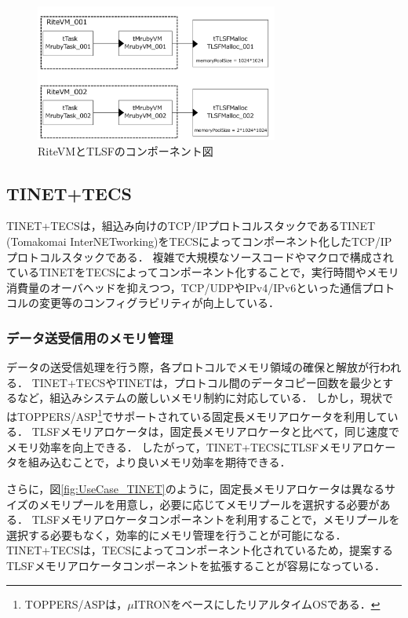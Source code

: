 \documentclass[submit,techrep]{ipsj_v2/UTF8/ipsj}
\begin{document}
\begin{figure}[t]
    \centering
    \includegraphics[width=8cm,clip]{figure/UseCase_mruby.pdf}
    \caption{RiteVMとTLSFのコンポーネント図}
    \label{fig:UseCase_mruby}
\end{figure}
    
\subsection{TINET+TECS}
\label{sec:TINET+TECS}

TINET+TECSは，組込み向けのTCP/IPプロトコルスタックであるTINET (Tomakomai InterNETworking)\cite{url:TINET}をTECSによってコンポーネント化したTCP/IPプロトコルスタックである．
複雑で大規模なソースコードやマクロで構成されているTINETをTECSによってコンポーネント化することで，実行時間やメモリ消費量のオーバヘッドを抑えつつ，TCP/UDPやIPv4/IPv6といった通信プロトコルの変更等のコンフィグラビリティが向上している．

\subsubsection{データ送受信用のメモリ管理}

データの送受信処理を行う際，各プロトコルでメモリ領域の確保と解放が行われる．
TINET+TECSやTINETは，プロトコル間のデータコピー回数を最少とするなど，組込みシステムの厳しいメモリ制約に対応している．
しかし，現状ではTOPPERS/ASP\footnote{TOPPERS/ASPは，$\mu$ITRON\cite{par:microITRON}をベースにしたリアルタイムOSである．}でサポートされている固定長メモリアロケータを利用している．
TLSFメモリアロケータは，固定長メモリアロケータと比べて，同じ速度でメモリ効率を向上できる．
したがって，TINET+TECSにTLSFメモリアロケータを組み込むことで，より良いメモリ効率を期待できる．

さらに，図\ref{fig:UseCase_TINET}のように，固定長メモリアロケータは異なるサイズのメモリプールを用意し，必要に応じてメモリプールを選択する必要がある．
TLSFメモリアロケータコンポーネントを利用することで，メモリプールを選択する必要もなく，効率的にメモリ管理を行うことが可能になる．
TINET+TECSは，TECSによってコンポーネント化されているため，提案するTLSFメモリアロケータコンポーネントを拡張することが容易になっている．
\end{document}
